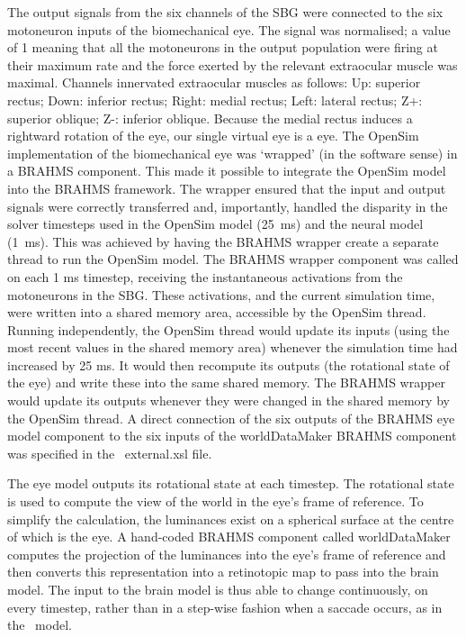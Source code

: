 \documentclass{frontiersSCNS}
\begin{document}
The output signals from the six channels of the SBG were connected to
the six motoneuron inputs of the biomechanical eye. The signal was
normalised; a value of 1 meaning that all the motoneurons in the
output population were firing at their maximum rate and the force
exerted by the relevant extraocular muscle was maximal. Channels
innervated extraocular muscles as follows: Up: superior rectus; Down:
inferior rectus; Right: medial rectus; Left: lateral rectus; Z+:
superior oblique; Z-: inferior oblique. Because the medial rectus
induces a rightward rotation of the eye, our single virtual eye is
a  eye. The OpenSim implementation of the biomechanical eye
was `wrapped' (in the software sense) in a BRAHMS component. This made
it possible to integrate the OpenSim model into the BRAHMS
framework. The wrapper ensured that the input and output signals were
correctly transferred and, importantly, handled the disparity in the
solver timesteps used in the OpenSim model (25~ms) and the neural
model (1~ms). This was achieved by having the BRAHMS wrapper create a
separate thread to run the OpenSim model. The BRAHMS wrapper component
was called on each 1 ms timestep, receiving the instantaneous
activations from the motoneurons in the SBG. These activations, and
the current simulation time, were written into a shared memory area,
accessible by the OpenSim thread. Running independently, the OpenSim
thread would update its inputs (using the most recent values in the
shared memory area) whenever the simulation time had increased by 25
ms. It would then recompute its outputs (the rotational state of the
eye) and write these into the same shared memory. The BRAHMS wrapper
would update its outputs whenever they were changed in the shared
memory by the OpenSim thread. A direct connection of the six outputs
of the BRAHMS eye model component to the six inputs of the
worldDataMaker BRAHMS component was specified in
the \stob~external.xsl file.

The eye model outputs its rotational state at each
timestep. The rotational state is used to compute the view of the
world in the eye's frame of reference. To simplify
the calculation, the luminances exist on a spherical surface at the
centre of which is the eye. A hand-coded BRAHMS component called
worldDataMaker computes the projection of the luminances into the
eye's frame of reference and then converts this representation into a
retinotopic map to pass into the brain model. The input to the brain
model is thus able to change continuously, on every timestep, rather
than in a step-wise fashion when a saccade occurs, as in the \ccg~model.
\end{document}
